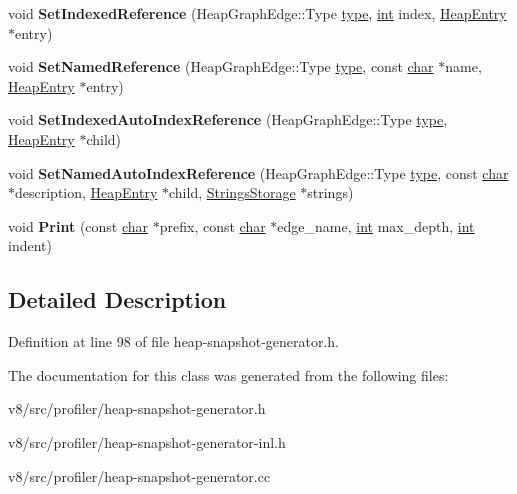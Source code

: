 \begin{DoxyCompactItemize}
\mbox{\label{classv8_1_1internal_1_1HeapEntry_a8c5ba07a005302d99c85a6cca0799e89}} 
void {\bfseries Set\+Indexed\+Reference} (Heap\+Graph\+Edge\+::\+Type \mbox{\hyperlink{classstd_1_1conditional_1_1type}{type}}, \mbox{\hyperlink{classint}{int}} index, \mbox{\hyperlink{classv8_1_1internal_1_1HeapEntry}{Heap\+Entry}} $\ast$entry)
\item 
\mbox{\label{classv8_1_1internal_1_1HeapEntry_a2babc0ad746ddd49d0d72a20fc5b26e5}} 
void {\bfseries Set\+Named\+Reference} (Heap\+Graph\+Edge\+::\+Type \mbox{\hyperlink{classstd_1_1conditional_1_1type}{type}}, const \mbox{\hyperlink{classchar}{char}} $\ast$name, \mbox{\hyperlink{classv8_1_1internal_1_1HeapEntry}{Heap\+Entry}} $\ast$entry)
\item 
\mbox{\label{classv8_1_1internal_1_1HeapEntry_aa14628153866b6375a447c8c8d2c9daf}} 
void {\bfseries Set\+Indexed\+Auto\+Index\+Reference} (Heap\+Graph\+Edge\+::\+Type \mbox{\hyperlink{classstd_1_1conditional_1_1type}{type}}, \mbox{\hyperlink{classv8_1_1internal_1_1HeapEntry}{Heap\+Entry}} $\ast$child)
\item 
\mbox{\label{classv8_1_1internal_1_1HeapEntry_a7913c5b2d63d8f12792550e03183cf94}} 
void {\bfseries Set\+Named\+Auto\+Index\+Reference} (Heap\+Graph\+Edge\+::\+Type \mbox{\hyperlink{classstd_1_1conditional_1_1type}{type}}, const \mbox{\hyperlink{classchar}{char}} $\ast$description, \mbox{\hyperlink{classv8_1_1internal_1_1HeapEntry}{Heap\+Entry}} $\ast$child, \mbox{\hyperlink{classv8_1_1internal_1_1StringsStorage}{Strings\+Storage}} $\ast$strings)
\item 
\mbox{\label{classv8_1_1internal_1_1HeapEntry_ac577d2a4de4b542592286977b032a496}} 
void {\bfseries Print} (const \mbox{\hyperlink{classchar}{char}} $\ast$prefix, const \mbox{\hyperlink{classchar}{char}} $\ast$edge\+\_\+name, \mbox{\hyperlink{classint}{int}} max\+\_\+depth, \mbox{\hyperlink{classint}{int}} indent)
\end{DoxyCompactItemize}


\subsection{Detailed Description}


Definition at line 98 of file heap-\/snapshot-\/generator.\+h.



The documentation for this class was generated from the following files\+:\begin{DoxyCompactItemize}
\item 
v8/src/profiler/heap-\/snapshot-\/generator.\+h\item 
v8/src/profiler/heap-\/snapshot-\/generator-\/inl.\+h\item 
v8/src/profiler/heap-\/snapshot-\/generator.\+cc\end{DoxyCompactItemize}
